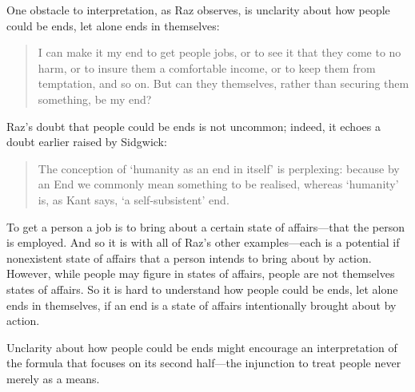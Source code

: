 \documentclass[12pt]{article}
\begin{document}
One obstacle to interpretation, as Raz observes, is unclarity about how people could be ends, let alone ends in themselves: 
\begin{quote}
	I can make it my end to get people jobs, or to see it that they come to no harm, or to insure them a comfortable income, or to keep them from temptation, and so on. But can they themselves, rather than securing them something, be my end? \citep[144]{Raz:2001ps} 
\end{quote}
Raz's doubt that people could be ends is not uncommon; indeed, it echoes a doubt earlier raised by Sidgwick:
\begin{quote}
    The conception of `humanity as an end in itself' is perplexing: because by an End we commonly mean something to be realised, whereas `humanity' is, as Kant says, `a self-subsistent' end. \citep[39]{Sidgwick:1981jk}
\end{quote}
To get a person a job is to bring about a certain state of affairs---that the person is employed. And so it is with all of Raz's other examples---each is a potential if nonexistent state of affairs that a person intends to bring about by action. However, while people may figure in states of affairs, people are not themselves states of affairs. So it is hard to understand how people could be ends, let alone ends in themselves, if an end is a state of affairs intentionally brought about by action. 

Unclarity about how people could be ends might encourage an interpretation of the formula that focuses on its second half---the injunction to treat people never merely as a means.
\end{document}
